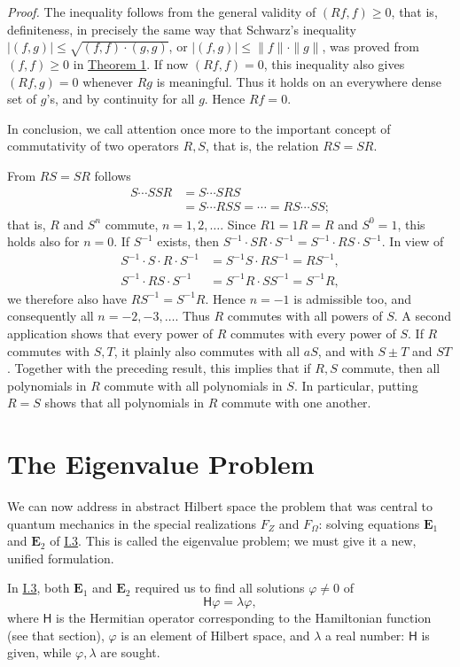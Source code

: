 \documentclass[fontsize=13pt,twoside,openany,headings=normal,parskip=false,bookmarkpackage=false,DIV=calc]{scrbook}
\begin{document}
\emph{Proof.} The inequality follows from the general validity of $(Rf,f)\geq0$, that is, definiteness, in precisely the same way that Schwarz's inequality $|(f,g)|\leq\sqrt{(f,f)\cdot(g,g)}$, or $|(f,g)|\leq\|f\|\cdot\|g\|$, was proved from $(f,f)\geq0$ in \hyperref[thm:II.1]{Theorem 1}. If now $(Rf,f)=0$, this inequality also gives $(Rf,g)=0$ whenever $Rg$ is meaningful. Thus it holds on an everywhere dense set of $g$'s, and by continuity for all $g$. Hence $Rf=0$.

In conclusion, we call attention once more to the important concept of commutativity of two operators $R,S$, that is, the relation $RS=SR$.

From $RS=SR$ follows
\begin{align*}
S\cdots SSR&=S\cdots SRS\\
&=S\cdots RSS=\cdots=RS\cdots SS;
\end{align*}
that is, $R$ and $S^n$ commute, $n=1,2,\ldots$. Since $R1=1R=R$ and $S^0=1$, this holds also for $n=0$. If $S^{-1}$ exists, then $S^{-1}\cdot SR\cdot S^{-1}=S^{-1}\cdot RS\cdot S^{-1}$. In view of
\begin{align*}
S^{-1}\cdot S\cdot R\cdot S^{-1}&=S^{-1}S\cdot RS^{-1}=RS^{-1},\\
S^{-1}\cdot RS\cdot S^{-1}&=S^{-1}R\cdot SS^{-1}=S^{-1}R,
\end{align*}
we therefore also have $RS^{-1}=S^{-1}R$. Hence $n=-1$ is admissible too, and consequently all $n=-2,-3,\ldots$. Thus $R$ commutes with all powers of $S$. A second application shows that every power of $R$ commutes with every power of $S$. If $R$ commutes with $S,T$, it plainly also commutes with all $aS$, and with $S\pm T$ and $ST$. Together with the preceding result, this implies that if $R,S$ commute, then all polynomials in $R$ commute with all polynomials in $S$. In particular, putting $R=S$ shows that all polynomials in $R$ commute with one another.

\section{The Eigenvalue Problem}\label{sec:II.6}
We can now address in abstract Hilbert space the problem that was central to quantum mechanics in the special realizations $F_Z$ and $F_\Omega$: solving equations $\hyperref[eq:I.3.E1]{\mathbf{E}_1}$ and $\hyperref[eq:I.3.E2]{\mathbf{E}_2}$ of \hyperref[sec:I.3]{I.3}. This is called the eigenvalue problem; we must give it a new, unified formulation.

In \hyperref[sec:I.3]{I.3}, both $\hyperref[eq:I.3.E1]{\mathbf{E}_1}$ and $\hyperref[eq:I.3.E2]{\mathbf{E}_2}$ required us to find all solutions $\varphi\ne0$ of
\begin{equation}
\mathsf H\varphi=\lambda\varphi,\tag{E}\label{eq:II.6.E}
\end{equation}
where $\mathsf H$ is the Hermitian operator corresponding to the Hamiltonian function (see that section), $\varphi$ is an element of Hilbert space, and $\lambda$ a real number: $\mathsf H$ is given, while $\varphi,\lambda$ are sought.
\end{document}
